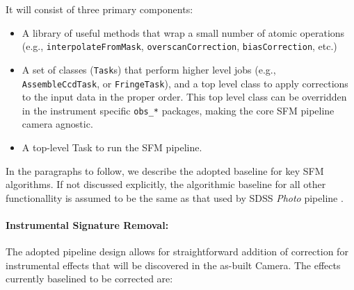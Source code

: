 \documentclass[12pt]{article}
\begin{document}
It will consist of three primary components:
%
\begin{itemize}
    \item A library of useful methods that wrap a small number of atomic operations (e.g., {\tt interpolateFromMask}, {\tt overscanCorrection}, {\tt biasCorrection}, etc.) %
    \item A set of classes ({\tt Task}s) that perform higher level jobs
    (e.g., {\tt AssembleCcdTask}, or {\tt FringeTask}), and a top level class to apply corrections to the input data in the proper order. This top level class can be overridden in the instrument specific {\tt obs\_*} packages, making the core SFM pipeline camera agnostic.
    \item A top-level Task to run the SFM pipeline.
\end{itemize}

In the paragraphs to follow, we describe the adopted baseline for key SFM algorithms. If not discussed explicitly, the algorithmic baseline for all other functionallity is assumed to be the same as that used by SDSS \emph{Photo} pipeline \cite{LuptonPhoto}.

\paragraph{Instrumental Signature Removal:}

The adopted pipeline design allows for straightforward addition of correction for instrumental effects that will be discovered in the as-built Camera. The effects currently baselined to be corrected are:
\end{document}
